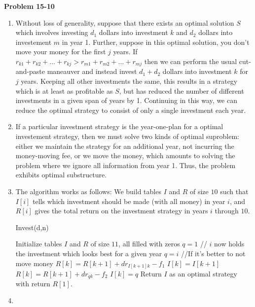 \documentclass{article}
\begin{document}
\noindent\textbf{Problem 15-10}\\
\begin{enumerate}
\item Without loss of generality, suppose that there exists an optimal solution $S$ which involves investing $d_1$ dollars into investment $k$ and $d_2$ dollars into investement $m$ in year 1.  Further, suppose in this optimal solution, you don't move your money for the first $j$ years.   If $r_{k1} + r_{k2} + \ldots + r_{kj} > r_{m1} + r_{m2} + \ldots + r_{mj}$ then we can perform the usual cut-and-paste maneauver and instead invest $d_1 + d_2$ dollars into investment $k$ for $j$ years.  Keeping all other investments the same, this results in a strategy which is at least as profitable as $S$, but has reduced the number of different investments in a given span of years by 1.  Continuing in this way, we can reduce the optimal strategy to consist of only a single investment each year.  \\

\item If a particular investment strategy is the year-one-plan for a optimal investement strategy, then we must solve two kinds of optimal suproblem: either we maintain the strategy for an additional year, not incurring the money-moving fee, or we move the money, which amounts to solving the problem where we ignore all information from year 1. Thus, the problem exhibits optimal substructure. \\

\item  The algorithm works as follows: We build tables $I$ and $R$ of size $10$ such that $I[i]$ tells which investment should be made (with all money) in year $i$, and $R[i]$ gives the total return on the investment strategy in years $i$ through $10$.  \\
\begin{algorithm}
\caption{Invest(d,n)}
\begin{algorithmic}
\State Initialize tables $I$ and $R$ of size $11$, all filled with zeros
	\State $q = 1$
		 // $i$ now holds the investment which looks best for a given year
			\State $q = i$
		\EndIf
	\EndFor
	 //If it's better to not move money
		\State $R[k] = R[k+1] + dr_{I[k+1]k} - f_1$
		\State $I[k] = I[k+1]$
	\Else
		\State $R[k] = R[k+1] + dr_{qk} - f_2$
		\State $I[k] = q$
	\EndIf
\EndFor
\State Return $I$ as an optimal strategy with return $R[1]$.
\end{algorithmic}
\end{algorithm}


\item %

\end{enumerate}
\end{document}
